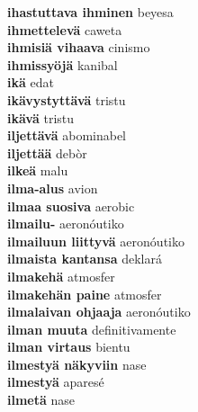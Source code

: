 \textbf{ ihastuttava ihminen  } beyesa \\
\textbf{ ihmettelevä  } caweta \\
\textbf{ ihmisiä vihaava  } cinismo \\
\textbf{ ihmissyöjä  } kanibal \\
\textbf{ ikä  } edat \\
\textbf{ ikävystyttävä  } tristu \\
\textbf{ ikävä  } tristu \\
\textbf{ iljettävä  } abominabel \\
\textbf{ iljettää  } debòr \\
\textbf{ ilkeä  } malu \\
\textbf{ ilma-alus  } avion \\
\textbf{ ilmaa suosiva  } aerobic \\
\textbf{ ilmailu-  } aeronóutiko \\
\textbf{ ilmailuun liittyvä  } aeronóutiko \\
\textbf{ ilmaista kantansa  } deklará \\
\textbf{ ilmakehä  } atmosfer \\
\textbf{ ilmakehän paine  } atmosfer \\
\textbf{ ilmalaivan ohjaaja  } aeronóutiko \\
\textbf{ ilman muuta  } definitivamente \\
\textbf{ ilman virtaus  } bientu \\
\textbf{ ilmestyä näkyviin  } nase \\
\textbf{ ilmestyä  } aparesé \\
\textbf{ ilmetä  } nase \\
